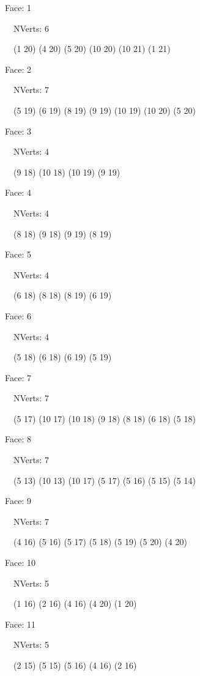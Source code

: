 \documentclass{article}
\begin{document}
{\footnotesize 

Face: 1

\   \    NVerts: 6

 \   \   (1 20) (4 20) (5 20) (10 20) (10 21) (1 21)}

{\footnotesize 

Face: 2

\   \    NVerts: 7

 \   \   (5 19) (6 19) (8 19) (9 19) (10 19) (10 20) (5 20)}

{\footnotesize 

Face: 3

\   \    NVerts: 4

 \   \   (9 18) (10 18) (10 19) (9 19)}

{\footnotesize 

Face: 4

\   \    NVerts: 4

 \   \   (8 18) (9 18) (9 19) (8 19)}

{\footnotesize 

Face: 5

\   \    NVerts: 4

 \   \   (6 18) (8 18) (8 19) (6 19)}

{\footnotesize 

Face: 6

\   \    NVerts: 4

 \   \   (5 18) (6 18) (6 19) (5 19)}

{\footnotesize 

Face: 7

\   \    NVerts: 7

 \   \   (5 17) (10 17) (10 18) (9 18) (8 18) (6 18) (5 18)}

{\footnotesize 

Face: 8

\   \    NVerts: 7

 \   \   (5 13) (10 13) (10 17) (5 17) (5 16) (5 15) (5 14)}

{\footnotesize 

Face: 9

\   \    NVerts: 7

 \   \   (4 16) (5 16) (5 17) (5 18) (5 19) (5 20) (4 20)}

{\footnotesize 

Face: 10

\   \    NVerts: 5

 \   \   (1 16) (2 16) (4 16) (4 20) (1 20)}

{\footnotesize 

Face: 11

\   \    NVerts: 5

 \   \   (2 15) (5 15) (5 16) (4 16) (2 16)}
\end{document}
